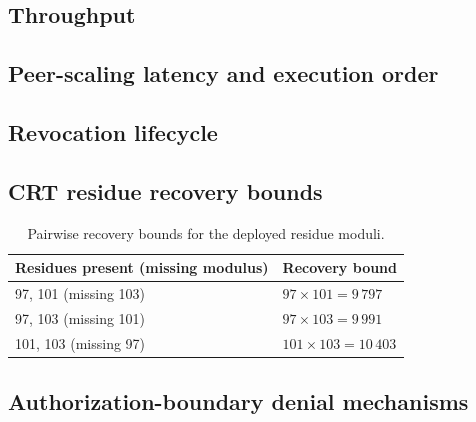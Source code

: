 \subsection{Throughput}



\subsection{Peer-scaling latency and execution order}







\subsection{Revocation lifecycle}



\begin{widefig}
\centering
{}
\caption{Gossip propagation across \RevEvents{} revocation-lifecycle events.}
\label{fig:revocation}
\end{widefig}

\subsection{CRT residue recovery bounds}

\begin{table}[t]
\caption{Pairwise recovery bounds for the deployed residue moduli.}
\label{tab:crtpairs}
\small
\begin{tabularx}{\columnwidth}{@{}lX@{}}
\toprule
Residues present (missing modulus) & Recovery bound \\
\midrule
97, 101 (missing 103) & $97\times 101 = 9\,797$ \\
97, 103 (missing 101) & $97\times 103 = 9\,991$ \\
101, 103 (missing 97) & $101\times 103 = 10\,403$ \\
\bottomrule
\end{tabularx}
\end{table}

\subsection{Authorization-boundary denial mechanisms}


